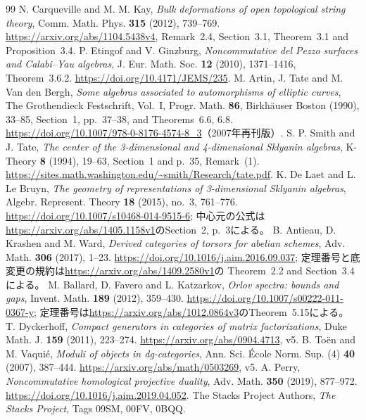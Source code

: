 \begin{thebibliography}{99}
 N. Carqueville and M. M. Kay,
\emph{Bulk deformations of open topological string theory},
Comm. Math. Phys. \textbf{315} (2012), 739--769.
\url{https://arxiv.org/abs/1104.5438v4},
Remark~2.4, Section~3.1, Theorem~3.1 and Proposition~3.4.
 P. Etingof and V. Ginzburg,
\emph{Noncommutative del Pezzo surfaces and Calabi--Yau algebras},
J. Eur. Math. Soc. \textbf{12} (2010), 1371--1416, Theorem~3.6.2.
\url{https://doi.org/10.4171/JEMS/235}.
 M. Artin, J. Tate and M. Van den Bergh,
\emph{Some algebras associated to automorphisms of elliptic curves},
The Grothendieck Festschrift, Vol.~I, Progr. Math. \textbf{86},
Birkh\"auser Boston (1990), 33--85,
Section~1, pp.~37--38, and Theorems~6.6, 6.8.
\url{https://doi.org/10.1007/978-0-8176-4574-8_3}（2007年再刊版）.
 S. P. Smith and J. Tate,
\emph{The center of the 3-dimensional and 4-dimensional Sklyanin algebras},
K-Theory \textbf{8} (1994), 19--63,
Section~1 and p.~35, Remark~(1).
\url{https://sites.math.washington.edu/~smith/Research/tate.pdf}.
 K. De Laet and L. Le Bruyn,
\emph{The geometry of representations of 3-dimensional Sklyanin algebras},
Algebr. Represent. Theory \textbf{18} (2015), no.~3, 761--776.
\url{https://doi.org/10.1007/s10468-014-9515-6};
中心元の公式は\url{https://arxiv.org/abs/1405.1158v1}のSection~2, p.~3による。
 B. Antieau, D. Krashen and M. Ward,
\emph{Derived categories of torsors for abelian schemes},
Adv. Math. \textbf{306} (2017), 1--23.
\url{https://doi.org/10.1016/j.aim.2016.09.037};
定理番号と底変更の規約は\url{https://arxiv.org/abs/1409.2580v1}の
Theorem~2.2 and Section~3.4による。
 M. Ballard, D. Favero and L. Katzarkov,
\emph{Orlov spectra: bounds and gaps},
Invent. Math. \textbf{189} (2012), 359--430.
\url{https://doi.org/10.1007/s00222-011-0367-y};
定理番号は\url{https://arxiv.org/abs/1012.0864v3}のTheorem~5.15による。
 T. Dyckerhoff,
\emph{Compact generators in categories of matrix factorizations},
Duke Math. J. \textbf{159} (2011), 223--274.
\url{https://arxiv.org/abs/0904.4713}, v5.
 B. To\"en and M. Vaqui\'e,
\emph{Moduli of objects in dg-categories},
Ann. Sci. \'Ecole Norm. Sup. (4) \textbf{40} (2007), 387--444.
\url{https://arxiv.org/abs/math/0503269}, v5.
 A. Perry,
\emph{Noncommutative homological projective duality},
Adv. Math. \textbf{350} (2019), 877--972.
\url{https://doi.org/10.1016/j.aim.2019.04.052}.
 The Stacks Project Authors,
\emph{The Stacks Project}, Tags 09SM, 00FV, 0BQQ.

\end{thebibliography}
